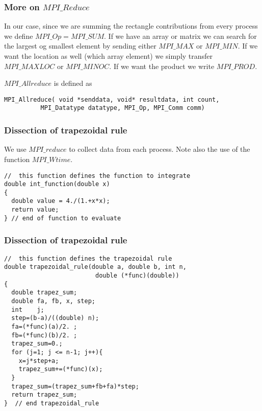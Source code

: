 \documentclass{beamer}
\begin{document}
\begin{frame}
\frametitle{More on $MPI\_Reduce$}

\begin{block}{}
In our case, since we are summing
the rectangle  contributions from every process we define  $MPI\_Op = MPI\_SUM$.
If we have an array or matrix we can search for the largest og smallest element by sending either $MPI\_MAX$ or 
$MPI\_MIN$.  If we want the location as well (which array element) we simply transfer 
$MPI\_MAXLOC$ or $MPI\_MINOC$. If we want the product we write $MPI\_PROD$. 

$MPI\_Allreduce$ is defined as
\begin{verbatim}
MPI_Allreduce( void *senddata, void* resultdata, int count, 
          MPI_Datatype datatype, MPI_Op, MPI_Comm comm)        
\end{verbatim}


\end{block}
\end{frame}

\begin{frame}
\frametitle{Dissection of trapezoidal rule}

\begin{block}{}

We use $MPI\_reduce$ to collect data from each process. Note also the use of the function 
$MPI\_Wtime$. 
\begin{verbatim}
//  this function defines the function to integrate
double int_function(double x)
{
  double value = 4./(1.+x*x);
  return value;
} // end of function to evaluate

\end{verbatim}


\end{block}
\end{frame}

\begin{frame}
\frametitle{Dissection of trapezoidal rule}

\begin{block}{}
\begin{verbatim}
//  this function defines the trapezoidal rule
double trapezoidal_rule(double a, double b, int n, 
                         double (*func)(double))
{
  double trapez_sum;
  double fa, fb, x, step;
  int    j;
  step=(b-a)/((double) n);
  fa=(*func)(a)/2. ;
  fb=(*func)(b)/2. ;
  trapez_sum=0.;
  for (j=1; j <= n-1; j++){
    x=j*step+a;
    trapez_sum+=(*func)(x);
  }
  trapez_sum=(trapez_sum+fb+fa)*step;
  return trapez_sum;
}  // end trapezoidal_rule 
\end{verbatim}


\end{block}
\end{frame}
\end{document}
